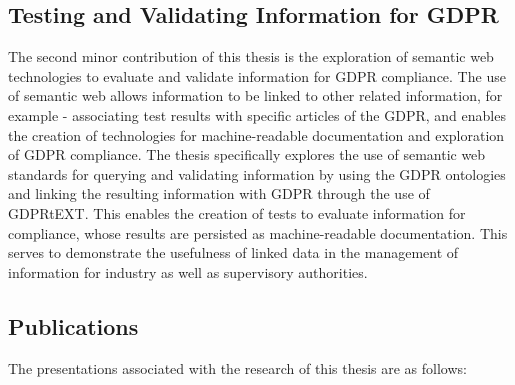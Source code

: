 \subsection{Testing and Validating Information for GDPR}
The second minor contribution of this thesis is the exploration of semantic web technologies to evaluate and validate information for GDPR compliance. The use of semantic web allows information to be linked to other related information, for example - associating test results with specific articles of the GDPR, and enables the creation of technologies for machine-readable documentation and exploration of GDPR compliance. The thesis specifically explores the use of semantic web standards for querying and validating information by using the GDPR ontologies and linking the resulting information with GDPR through the use of GDPRtEXT. This enables the creation of tests to evaluate information for compliance, whose results are persisted as machine-readable documentation. This serves to demonstrate the usefulness of linked data in the management of information for industry as well as supervisory authorities.

\subsection{Publications}
The presentations associated with the research of this thesis are as follows:

